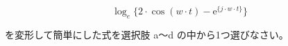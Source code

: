 \[
\log_e \{ 2 \cdot \cos( w \cdot t ) - \textrm{e}^{\{ j \cdot w \cdot t \}} \}
\]

\bigskip
\noindent を変形して簡単にした式を選択肢 a〜d の中から1つ選びなさい。
